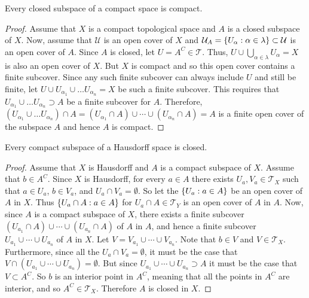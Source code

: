 \documentclass[letterpaper,12pt,fleqn]{article}
\newcommand{\U}{\mathcal{U}}
\renewcommand{\a}{\alpha}
\renewcommand{\l}{\lambda}
\newcommand{\T}{\mathscr{T}}
\begin{document}
\begin{theorem}[6.8]
  Every closed subspace of a compact space is compact.
\end{theorem}

\begin{proof}
  Assume that \(X\) is a compact topological space and \(A\) is a closed subspace of \(X\).  Now, assume that
  \(\U\) is an open cover of \(X\) and \(\U_A=\set{U_{\a}:\a\in\l}\subset\U\) is an open cover of \(A\).  Since \(A\)
  is closed, let \(U=A^C\in\T\).  Thus, \(U\cup\bigcup_{\a\in\l}U_{\a}=X\) is also an open cover of \(X\).  But \(X\)
  is compact and so this open cover contains a finite subcover.  Since any such finite subcover can always include
  \(U\) and still be finite, let \(U\cup U_{\a_1}\cup\ldots U_{\a_n}=X\) be such a finite subcover.  This requires that
  \(U_{\a_1}\cup\ldots U_{\a_n}\supset A\) be a finite subcover for \(A\).  Therefore,
  \((U_{\a_1}\cup\ldots U_{\a_n})\cap A=(U_{\a_1}\cap A)\cup\cdots\cup(U_{\a_n}\cap A)=A\) is a finite open cover of the
  subspace \(A\) and hence \(A\) is compact.
\end{proof}

\begin{theorem}[6.9]
  Every compact subspace of a Hausdorff space is closed.
\end{theorem}

\begin{proof}
  Assume that \(X\) is Hausdorff and \(A\) is a compact subspace of \(X\).  Assume that \(b\in A^C\).  Since \(X\)
  is Hausdorff, for every \(a\in A\) there exists \(U_a,V_a\in\T_X\) such that \(a\in U_a\), \(b\in V_a\), and
  \(U_a\cap V_a=\emptyset\).  So let the \(\{U_a:a\in A\}\) be an open cover of \(A\) in \(X\).  Thus
  \(\{U_a\cap A:a\in A\}\) for \(U_a\cap A\in\T_Y\) is an open cover of \(A\) in \(A\).  Now, since \(A\) is a
  compact subspace of \(X\), there exists a finite subcover \((U_{a_1}\cap A)\cup\cdots\cup(U_{a_n}\cap A)\) of
  \(A\) in \(A\), and hence a finite subcover \(U_{a_1}\cup\cdots\cup U_{a_n}\) of \(A\) in \(X\).  Let
  \(V=V_{a_1}\cup\cdots\cup V_{a_n}\).  Note that \(b\in V\) and \(V\in\T_X\).  Furthermore, since all the
  \(U_a\cap V_a=\emptyset\), it must be the case that \(V\cap(U_{a_1}\cup\cdots\cup U_{a_n})=\emptyset\).  But
  since \(U_{a_1}\cup\cdots\cup U_{a_n}\supset A\) it must be the case that \(V\subset A^C\).  So \(b\) is an
  interior point in \(A^C\), meaning that all the points in \(A^C\) are interior, and so \(A^C\in\T_X\).  Therefore
  \(A\) is closed in \(X\).
\end{proof}
\end{document}

